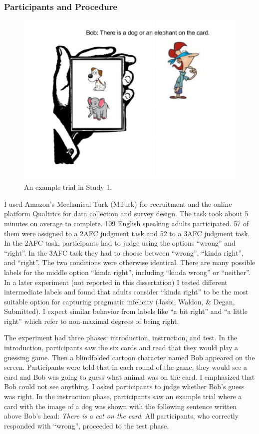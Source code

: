 \documentclass[oneside]{report}
\theoremstyle{definition}
\theoremstyle{definition}
\theoremstyle{definition}
\theoremstyle{remark}
\begin{document}
\subsubsection{Participants and
Procedure}\label{participants-and-procedure}
\begin{figure}[t]

{\centering \includegraphics{figs/exampleTrial-1} 

}

\caption{An example trial in Study 1.}\label{fig:exampleTrial}
\end{figure}
I used Amazon's Mechanical Turk (MTurk) for recruitment and the online
platform Qualtrics for data collection and survey design. The task took
about 5 minutes on average to complete. 109 English speaking adults
participated. 57 of them were assigned to a 2AFC judgment task and 52 to
a 3AFC judgment task. In the 2AFC task, participants had to judge using
the options ``wrong'' and ``right''. In the 3AFC task they had to choose
between ``wrong'', ``kinda right'', and ``right''. The two conditions
were otherwise identical. There are many possible labels for the middle
option ``kinda right'', including ``kinda wrong'' or ``neither''. In a
later experiment (not reported in this dissertation) I tested different
intermediate labels and found that adults consider ``kinda right'' to be
the most suitable option for capturing pragmatic infelicity (Jasbi,
Waldon, \& Degan, Submitted). I expect similar behavior from labels like
``a bit right'' and ``a little right'' which refer to non-maximal
degrees of being right.

The experiment had three phases: introduction, instruction, and test. In
the introduction, participants saw the six cards and read that they
would play a guessing game. Then a blindfolded cartoon character named
Bob appeared on the screen. Participants were told that in each round of
the game, they would see a card and Bob was going to guess what animal
was on the card. I emphasized that Bob could not see anything. I asked
participants to judge whether Bob's guess was right. In the instruction
phase, participants saw an example trial where a card with the image of
a dog was shown with the following sentence written above Bob's head:
\emph{There is a cat on the card}. All participants, who correctly
responded with ``wrong'', proceeded to the test phase.
\end{document}
